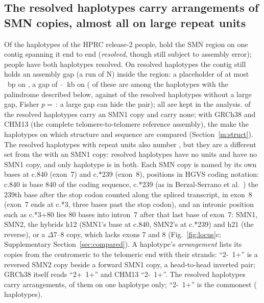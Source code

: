 \documentclass[10pt]{article}
\begin{document}
\subsection{The resolved haplotypes carry \arrTypes{} arrangements of SMN copies, almost all on large repeat units}\label{m:arr}
Of the \nHapsAll{} haplotypes of the \nPeopleAll{} HPRC release-2 people, \nHapsRes{} hold the SMN region on one
contig spanning it end to end (\emph{resolved}, though still subject to assembly error); \nPeopleBoth{} people have both haplotypes resolved. On \gapRes{} resolved haplotypes the contig still holds an assembly gap (a run of N) inside the region: a placeholder of at most \gapSmallMax~bp on \gapSmall, a gap of \gapBigMin--\gapBigMax~kb on \gapBig{} (\gapBigPal{} of these \gapBig{} are among the \elHaps{} haplotypes with the palindrome described below, against \gapRestPal{} of the \gapRestN{} resolved haplotypes without a large gap, Fisher $p=$\,\gapPalP: a large gap can hide the pair); all are kept in the analysis.
\nHapsResSMNone{} of the resolved haplotypes carry an SMN1 copy and \nHapsResNoSMNone{} carry none; with GRCh38 and CHM13 (the complete telomere-to-telomere reference assembly),
the \nHapsResSMNone{} make the \mlbHaps{} haplotypes on which structure and sequence are compared (Section~\ref{m:struct}).
The resolved haplotypes with repeat units also number \palHaps, but they are a different set from the \nHapsResSMNone{} with an SMN1 copy: \nHapsNoUnits{} resolved haplotypes have no
units and \nHapsResNoSMNone{} have no SMN1 copy, and only \nHapsNoUnitsNoSMNone{} haplotype is in both. Each SMN copy is
named by its own bases at c.840 (exon~7) and c.*239 (exon~8), positions in HGVS coding notation: c.840 is base 840 of the coding sequence, c.*239 (as in Berzal-Serrano et al.~\cite{berzal2026}) the 239th base after the stop codon counted along the spliced transcript, in exon~8 (exon~7 ends at c.*3, three bases past the stop codon), and an intronic position such as c.*3+80 lies 80 bases into intron~7 after that last base of exon~7: SMN1, SMN2, the hybrids h12 (SMN1's base at c.840, SMN2's at c.*239) and h21 (the
reverse), or a $\Delta$7--8 copy, which lacks exons 7 and 8 (Fig.~\ref{fig:locus}c; Supplementary Section~\ref{sec:compared}). A haplotype's
\emph{arrangement} lists its copies from the centromeric to the telomeric end with their strands: ``2-~1+'' is a
reversed SMN2 copy beside a forward SMN1 copy, a head-to-head inverted pair; GRCh38 itself reads ``2+~1+'' and CHM13
``2-~1+''. The resolved haplotypes carry \arrTypes{} arrangements, \arrOnce{} of them on one haplotype only; ``2-~1+''
is the commonest (\arrTopN{} haplotypes).
\end{document}

